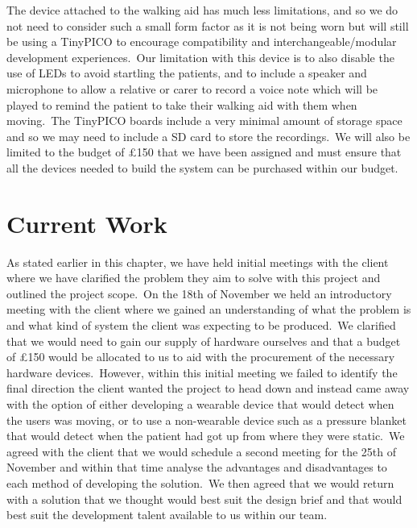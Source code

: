             The device attached to the walking aid has much less limitations, and so we do not need to consider such a
            small form factor as it is not being worn but will still be using a TinyPICO to encourage compatibility and
            interchangeable/modular development experiences.\ Our limitation with this device is to also disable the use
            of LEDs to avoid startling the patients, and to include a speaker and microphone to allow a relative or
            carer to record a voice note which will be played to remind the patient to take their walking aid with them
            when moving.\ The TinyPICO boards include a very minimal amount of storage space and so we may need to
            include a SD card to store the recordings.\ We will also be limited to the budget of £150 that we have been
            assigned and must ensure that all the devices needed to build the system can be purchased within our budget.

    \section{Current Work}
        As stated earlier in this chapter, we have held initial meetings with the client where we have clarified the
        problem they aim to solve with this project and outlined the project scope.\ On the 18th of November we held an
        introductory meeting with the client where we gained an understanding of what the problem is and what kind of
        system the client was expecting to be produced.\ We clarified that we would need to gain our supply of hardware
        ourselves and that a budget of £150 would be allocated to us to aid with the procurement of the necessary
        hardware devices.\ However, within this initial meeting we failed to identify the final direction the client
        wanted the project to head down and instead came away with the option of either developing a wearable device
        that would detect when the users was moving, or to use a non-wearable device such as a pressure
        blanket that would detect when the patient had got up from where they were static.\ We agreed with the client
        that we would schedule a second meeting for the 25th of November and within that time analyse the advantages
        and disadvantages to each method of developing the solution.\ We then agreed that we would return with a solution
        that we thought would best suit the design brief and that would best suit the development talent available to us
        within our team.

